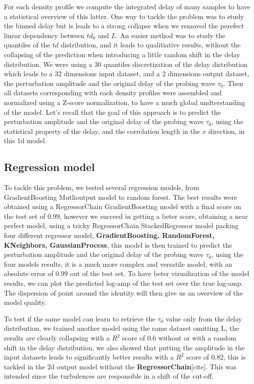 \documentclass[11pt,a4paper]{report}
\begin{document}
\begin{multicols}{2}
    For each density profile we compute the integrated delay of many samples to have a statistical overview of this latter. One way to tackle the problem was to study the binned delay but is leads to a strong collapse when we removed the perefect linear dependency between $td_0$ and $L$. An easier method was to study the quantiles of the $td$ distribution, and it leads to qualitiative results, without the collapsing of the prediction when introducing a little random shift in the delay distribution.
    We were using a 30 quantiles discretization of the delay distribution which leads to a 32 dimensions input dataset, and a 2 dimensions output dataset, the perturbation amplitude and the original delay of the probing wave $\tau_0$. Then all datasets corresponding with each density profiles were assembled and normalized using a Z-score normalization, to have a much global undterstanding of the model.
    Let's recall that the goal of this approach is to predict the perturbation amplitude and the original delay of the probing wave $\tau_0$, using the statistical property of the delay, and the correlation length in the $x$ direction, in this 1d model.


    \subsection{Regression model}
    To tackle this problem, we tested several regression models, from GradientBoosting Mutlioutput model to random forest.
    The best results were obtained using a RegressorChain GradientBoosting model with a final score on the test set of 0.99, however we succeed in getting a beter score, obtaining a near perfect model, using a tricky RegressorChain StackedRegressor model packing four different regressor model,
    \textbf{GradientBoosting, RandomForest, KNeighbors, GaussianProcess}, this model is then trained to predict the perturbation amplitude and the original delay of the probing wave $\tau_0$, using the four models results, it is a much more complex and versatile model, with an absolute error of 0.99 out of the test set.
    To have beter vizualization of the model results, we can plot the predicted log-amp of the test set over the true log-amp. The dispersion of point around the identity will then give us an overview of the model quality.

    To test if the same model can learn to retrieve the $\tau_0$ value only from the delay distribution, we trained another model using the same dataset omitting L, the results are clearly collapsing with a $R^2$ score of 0.6 without or with a random shift in the delay distribution, we also showed that putting the amplitude in the input datasets leads to significantly better results with a $R^2$ score of 0.82, this is tackled in the 2d output model without the \textbf{RegressorChain}[cite]. This was intended since the turbulences are responsible in a shift of the cut-off.


\end{multicols}
\end{document}
